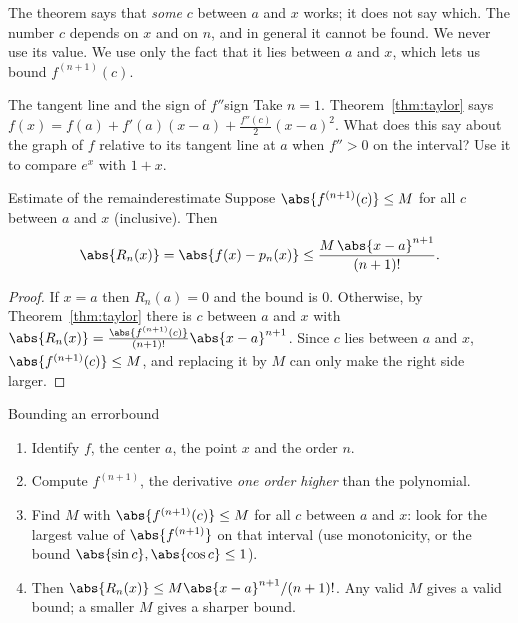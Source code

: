 \documentclass[11pt]{article}
\begin{document}
\begin{warn}
The theorem says that \emph{some} $c$ between $a$ and $x$ works; it does not say which. The number $c$ depends on $x$ and on $n$, and in general it cannot be found. We never use its value. We use only the fact that it lies between $a$ and $x$, which lets us bound $f^{(n+1)}(c)$.
\end{warn}

\begin{think}{The tangent line and the sign of $f''$}{sign}
Take $n=1$. Theorem~\ref{thm:taylor} says $f(x)=f(a)+f'(a)(x-a)+\frac{f''(c)}2(x-a)^2$. What does this say about the graph of $f$ relative to its tangent line at $a$ when $f''>0$ on the interval? Use it to compare $e^x$ with $1+x$.
\end{think}

\begin{thm}{Estimate of the remainder}{estimate}
Suppose $\abs{f^{(n+1)}(c)}\le M$ for all $c$ between $a$ and $x$ (inclusive). Then
\[
\abs{R_n(x)}=\abs{f(x)-p_n(x)}\le\frac{M\,\abs{x-a}^{n+1}}{(n+1)!}.
\]
\end{thm}
\begin{proof}
If $x=a$ then $R_n(a)=0$ and the bound is $0$. Otherwise, by Theorem~\ref{thm:taylor} there is $c$ between $a$ and $x$ with $\abs{R_n(x)}=\frac{\abs{f^{(n+1)}(c)}}{(n+1)!}\abs{x-a}^{n+1}$. Since $c$ lies between $a$ and $x$, $\abs{f^{(n+1)}(c)}\le M$, and replacing it by $M$ can only make the right side larger.
\end{proof}

\begin{proc}{Bounding an error}{bound}
\begin{enumerate}[nosep]
  \item Identify $f$, the center $a$, the point $x$ and the order $n$.
  \item Compute $f^{(n+1)}$, the derivative \emph{one order higher} than the polynomial.
  \item Find $M$ with $\abs{f^{(n+1)}(c)}\le M$ for all $c$ between $a$ and $x$: look for the largest value of $\abs{f^{(n+1)}}$ on that interval (use monotonicity, or the bound $\abs{\sin c},\abs{\cos c}\le1$).
  \item Then $\abs{R_n(x)}\le M\abs{x-a}^{n+1}/(n+1)!$. Any valid $M$ gives a valid bound; a smaller $M$ gives a sharper bound.
\end{enumerate}
\end{proc}
\end{document}

